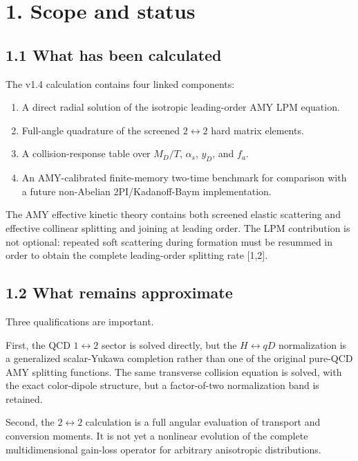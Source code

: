 \documentclass[
  10pt,
]{article}
\providecommand{\tightlist}{%
  \setlength{\itemsep}{0pt}\setlength{\parskip}{0pt}}
\begin{document}
\section{1. Scope and status}\label{scope-and-status}

\subsection{1.1 What has been
calculated}\label{what-has-been-calculated}

The v1.4 calculation contains four linked components:

\begin{enumerate}
\def\labelenumi{\arabic{enumi}.}
\tightlist
\item
  A direct radial solution of the isotropic leading-order AMY LPM
  equation.
\item
  Full-angle quadrature of the screened \(2\leftrightarrow2\) hard
  matrix elements.
\item
  A collision-response table over \(M_D/T\), \(\alpha_s\), \(y_D\), and
  \(f_a\).
\item
  An AMY-calibrated finite-memory two-time benchmark for comparison with
  a future non-Abelian 2PI/Kadanoff-Baym implementation.
\end{enumerate}

The AMY effective kinetic theory contains both screened elastic
scattering and effective collinear splitting and joining at leading
order. The LPM contribution is not optional: repeated soft scattering
during formation must be resummed in order to obtain the complete
leading-order splitting rate {[}1,2{]}.

\subsection{1.2 What remains
approximate}\label{what-remains-approximate}

Three qualifications are important.

First, the QCD \(1\leftrightarrow2\) sector is solved directly, but the
\(H\leftrightarrow qD\) normalization is a generalized scalar-Yukawa
completion rather than one of the original pure-QCD AMY splitting
functions. The same transverse collision equation is solved, with the
exact color-dipole structure, but a factor-of-two normalization band is
retained.

Second, the \(2\leftrightarrow2\) calculation is a full angular
evaluation of transport and conversion moments. It is not yet a
nonlinear evolution of the complete multidimensional gain-loss operator
for arbitrary anisotropic distributions.
\end{document}
